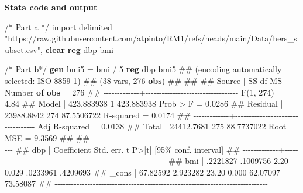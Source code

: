 \documentclass[
  letterpaper,
  DIV=11,
  numbers=noendperiod]{scrreprt}
\newenvironment{Shaded}{\begin{snugshade}}{\end{snugshade}}
\newcommand{\CommentTok}[1]{\textcolor[rgb]{0.37,0.37,0.37}{#1}}
\newcommand{\DataTypeTok}[1]{\textcolor[rgb]{0.68,0.00,0.00}{#1}}
\newcommand{\FunctionTok}[1]{\textcolor[rgb]{0.28,0.35,0.67}{#1}}
\newcommand{\KeywordTok}[1]{\textcolor[rgb]{0.00,0.23,0.31}{\textbf{#1}}}
\newcommand{\NormalTok}[1]{\textcolor[rgb]{0.00,0.23,0.31}{#1}}
\newcommand{\StringTok}[1]{\textcolor[rgb]{0.13,0.47,0.30}{#1}}
\begin{document}
\textbf{Stata code and output}

\begin{Shaded}
\begin{Highlighting}[]
\CommentTok{/* Part a */}
\NormalTok{import delimited }\StringTok{"https://raw.githubusercontent.com/atpinto/RM1/refs/heads/main/Data/hers\_subset.csv"}\NormalTok{, }\KeywordTok{clear}
\KeywordTok{reg}\NormalTok{ dbp bmi}

\CommentTok{/* Part b*/}
\KeywordTok{gen}\NormalTok{ bmi5 = bmi / 5}
\KeywordTok{reg}\NormalTok{ dbp bmi5}
\NormalTok{\#\# (encoding automatically selected: ISO{-}8859{-}1)}
\NormalTok{\#\# (38 vars, 276 }\KeywordTok{obs}\NormalTok{)}
\NormalTok{\#\# }
\NormalTok{\#\# }
\NormalTok{\#\#       Source |       SS           df       MS      Number }\KeywordTok{of} \KeywordTok{obs}\NormalTok{   =       276}
\NormalTok{\#\# {-}{-}{-}{-}{-}{-}{-}{-}{-}{-}{-}{-}{-}+{-}{-}{-}{-}{-}{-}{-}{-}{-}{-}{-}{-}{-}{-}{-}{-}{-}{-}{-}{-}{-}{-}{-}{-}{-}{-}{-}{-}{-}{-}{-}{-}{-}{-}   }\FunctionTok{F}\NormalTok{(1, 274)       =      4.84}
\NormalTok{\#\#        Model |  423.883938         1  423.883938   Prob \textgreater{} }\FunctionTok{F}\NormalTok{        =    0.0286}
\NormalTok{\#\#     Residual |  23988.8842       274  87.5506722   R{-}squared       =    0.0174}
\NormalTok{\#\# {-}{-}{-}{-}{-}{-}{-}{-}{-}{-}{-}{-}{-}+{-}{-}{-}{-}{-}{-}{-}{-}{-}{-}{-}{-}{-}{-}{-}{-}{-}{-}{-}{-}{-}{-}{-}{-}{-}{-}{-}{-}{-}{-}{-}{-}{-}{-}   Adj R{-}squared   =    0.0138}
\NormalTok{\#\#        Total |  24412.7681       275  88.7737022   Root MSE        =    9.3569}
\NormalTok{\#\# }
\NormalTok{\#\# {-}{-}{-}{-}{-}{-}{-}{-}{-}{-}{-}{-}{-}{-}{-}{-}{-}{-}{-}{-}{-}{-}{-}{-}{-}{-}{-}{-}{-}{-}{-}{-}{-}{-}{-}{-}{-}{-}{-}{-}{-}{-}{-}{-}{-}{-}{-}{-}{-}{-}{-}{-}{-}{-}{-}{-}{-}{-}{-}{-}{-}{-}{-}{-}{-}{-}{-}{-}{-}{-}{-}{-}{-}{-}{-}{-}{-}{-}}
\NormalTok{\#\#          dbp | Coefficient  Std. err.      t    P\textgreater{}|t|     [95\% conf. interval]}
\NormalTok{\#\# {-}{-}{-}{-}{-}{-}{-}{-}{-}{-}{-}{-}{-}+{-}{-}{-}{-}{-}{-}{-}{-}{-}{-}{-}{-}{-}{-}{-}{-}{-}{-}{-}{-}{-}{-}{-}{-}{-}{-}{-}{-}{-}{-}{-}{-}{-}{-}{-}{-}{-}{-}{-}{-}{-}{-}{-}{-}{-}{-}{-}{-}{-}{-}{-}{-}{-}{-}{-}{-}{-}{-}{-}{-}{-}{-}{-}{-}}
\NormalTok{\#\#          bmi |   .2221827   .1009756     2.20   0.029     .0233961    .4209693}
\NormalTok{\#\#        }\DataTypeTok{\_cons}\NormalTok{ |   67.82592   2.923282    23.20   0.000     62.07097    73.58087}
\NormalTok{\#\# {-}{-}{-}{-}{-}{-}{-}{-}{-}{-}{-}{-}{-}{-}{-}{-}{-}{-}{-}{-}{-}{-}{-}{-}{-}{-}{-}{-}{-}{-}{-}{-}{-}{-}{-}{-}{-}{-}{-}{-}{-}{-}{-}{-}{-}{-}{-}{-}{-}{-}{-}{-}{-}{-}{-}{-}{-}{-}{-}{-}{-}{-}{-}{-}{-}{-}{-}{-}{-}{-}{-}{-}{-}{-}{-}{-}{-}{-}}

\end{Highlighting}
\end{Shaded}
\end{document}
